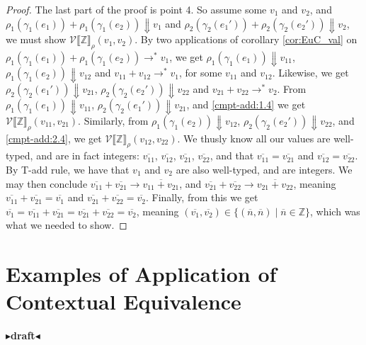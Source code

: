 \documentclass[twoside,11pt,openright]{report}
\theoremstyle{definition}
\newcommand{\expr}{e}
\newcommand{\val}{v}
\newcommand{\Num}[1]{\overline{#1}}
\newcommand{\Tint}{\mathbb{Z}}
\newcommand{\step}{\rightarrow}
\newcommand{\stepS}{\rightarrow^*}
\newcommand{\ValInp}[2]{\mathcal{V} \llbracket #1 \rrbracket_{#2}}
\newcommand{\todo}[1]{{\color[rgb]{.5,0,0}\textbf{$\blacktriangleright$#1$\blacktriangleleft$}}}
\begin{document}
\begin{proof}
  The last part of the proof is point 4. So assume some $\val_1$ and $\val_2$, and $\rho_1(\gamma_1(\expr_1)) + \rho_1(\gamma_1(\expr_2)) \Downarrow \val_1$ and $\rho_2(\gamma_2(\expr_1')) + \rho_2(\gamma_2(\expr_2')) \Downarrow \val_2$, we must show $\ValInp{\Tint}{\rho}(\val_1, \val_2)$. By two applications of corollary \ref{cor:EuC_val} on $\rho_1(\gamma_1(\expr_1)) + \rho_1(\gamma_1(\expr_2)) \stepS \val_1$, we get $\rho_1(\gamma_1(\expr_1)) \Downarrow \val_{11}$,  $\rho_1(\gamma_1(\expr_2)) \Downarrow \val_{12}$ and $\val_{11} + \val_{12} \stepS \val_1$, for some $\val_{11}$ and $\val_{12}$. Likewise, we get $\rho_2(\gamma_2(\expr_1')) \Downarrow \val_{21}$, $\rho_2(\gamma_2(\expr_2')) \Downarrow \val_{22}$ and $\val_{21} + \val_{22} \stepS \val_2$. From $\rho_1(\gamma_1(\expr_1)) \Downarrow \val_{11}$, $\rho_2(\gamma_2(\expr_1')) \Downarrow \val_{21}$, and \ref*{cmpt-add:1.4} we get $\ValInp{\Tint}{\rho}(\val_{11}, \val_{21})$. Similarly, from $\rho_1(\gamma_1(\expr_2)) \Downarrow \val_{12}$, $\rho_2(\gamma_2(\expr_2')) \Downarrow \val_{22}$, and \ref*{cmpt-add:2.4}, we get $\ValInp{\Tint}{\rho}(\val_{12}, \val_{22})$. We thusly know all our values are well-typed, and are in fact integers: $\Num{\val_{11}}$, $\Num{\val_{12}}$, $\Num{\val_{21}}$, $\Num{\val_{22}}$, and that $\Num{\val_{11}} = \Num{\val_{21}}$ and $\Num{\val_{12}} = \Num{\val_{22}}$. By T-add rule, we have that $\val_1$ and $\val_2$ are also well-typed, and are integers. We may then conclude $\Num{\val_{11}} + \Num{\val_{21}} \step \Num{\val_{11} + \val_{21}}$, and $\Num{\val_{21}} + \Num{\val_{22}} \step \Num{\val_{21} + \val_{22}}$, meaning $\Num{\val_{11}} + \Num{\val_{21}} = \Num{\val_1}$ and $\Num{\val_{21}} + \Num{\val_{22}} = \Num{\val_2}$. Finally, from this we get $\Num{\val_1} = \Num{\val_{11}} + \Num{\val_{21}} = \Num{\val_{21}} + \Num{\val_{22}} = \Num{\val_2}$, meaning $(\Num{\val_1}, \Num{\val_2}) \in \{(\Num{n}, \Num{n}) \mid \Num{n} \in \Tint\}$, which was what we needed to show.
\end{proof}


\chapter{Examples of Application of Contextual Equivalence}
\label{ch:ACE}

\todo{draft}

\end{document}
